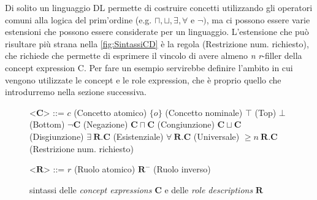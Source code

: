 Di solito un linguaggio DL permette di costruire concetti utilizzando gli operatori comuni alla logica del prim’ordine (e.g. $\sqcap, \sqcup, \exists, \forall \text{ e } \neg)$, ma ci possono essere varie estensioni che possono essere considerate per un linguaggio. L'estensione che può risultare più strana nella \autoref{fig:SintassiCD} è la regola (Restrizione num. richiesto), che richiede che permette di esprimere il vincolo di avere almeno \textit{n} \textit{r}-filler della concept expression C. Per fare un esempio servirebbe definire l'ambito in cui vengono utilizzate le concept e le role expression, che è proprio quello che introdurremo nella sezione successiva.\\
\begin{figure}[b!]
	\begin{center}	
		\begin{minipage}{0.6\textwidth}
			\setlength{\grammarindent}{3em} %
			\begin{grammar}
				\let\syntleft\relax
				\let\syntright\relax
				<$\mathbf{C}$> ::= $c$ \hfill (Concetto atomico)
				\alt $\{o\}$ \hfill (Concetto nominale)
				\alt $\top$ \hfill (Top)
				\alt $\bot$ \hfill (Bottom)
				\alt $\neg \mathbf{C} $ \hfill (Negazione)
				\alt $\mathbf{C} \sqcap \mathbf{C}$ \hfill (Congiunzione)
				\alt $\mathbf{C} \sqcup \mathbf{C}$ \hfill (Disgiunzione)
				\alt $\exists\ \mathbf{R}. \mathbf{C}$ \hfill (Esistenziale)
				\alt $\forall\ \mathbf{R}. \mathbf{C}$ \hfill (Universale)
				\alt $\ge n\ \mathbf{R} . \mathbf{C}$ \hfill (Restrizione num. richiesto)
				
				<$\mathbf{R}$> ::= $r$ \hfill (Ruolo atomico)
				\alt $\mathbf{R}^-$ \hfill (Ruolo inverso)
			\end{grammar}
		\end{minipage}
		\caption{sintassi delle \textit{concept expressions} $\mathbf{C}$ e delle \textit{role descriptions} $\mathbf{R}$}
		\label{fig:SintassiCD}
	\end{center}
\end{figure}

